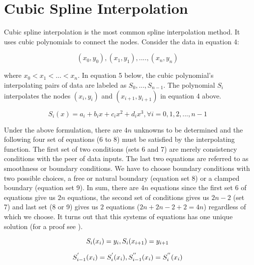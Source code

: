 \documentclass[12pt]{article}
\newcommand{\1}{\mathbbm 1}
\begin{document}
		
		\section*{Cubic Spline Interpolation}
		
		Cubic spline interpolation is the most common spline interpolation method. It uses cubic polynomials to connect the nodes. Consider the data in equation 4:
		
		\begin{equation}
			(x_{0}, y_{0}), (x_{1}, y_{1}), .... , (x_{n}, y_{n})
		\end{equation}
		
		
		where $x_{0} < x_{1} < ... < x_{n}$. In equation 5 below, the cubic polynomial's interpolating pairs of data are labeled as $S_{0},..., S_{n-1}$. The polynomial $S_{i}$ interpolates the nodes $(x_{i}, y_{i})$ and $(x_{i+1}, y_{i+1})$ in equation 4 above.
		
		
		\begin{equation}
			S_{i}(x) = a_{i} + b_{i}x + c_{i}x^{2} + d_{i}x^{3}, \forall i = 0, 1, 2, ... ,n-1
		\end{equation}
		
		
		Under the above formulation, there are $4n$ unknowns to be determined and the following four set of equations (6 to 8) must be satisfied by the interpolating function. The first set of two conditions (sets 6 and 7) are merely consistency conditions with the peer of data inputs. The last two equations are referred to as smoothness or boundary conditions. We have to choose boundary conditions with two possible choices, a free or natural boundary (equation set 8) or a clamped boundary (equation set 9). In sum, there are $4n$ equations since the first set 6 of equations give us $2n$ equations, the second set of conditions gives us $2n-2$ (set 7) and last set (8 or 9) gives us $2$ equations ($2n + 2n -2 + 2 = 4n$) regardless of which we choose. It turns out that this systems of equations has one unique solution (for a proof see \cite{burden2015numerical}).
		
		
		
		
		\begin{equation}
			S_{i}(x_{i}) = y_{i}, \\ S_{i}(x_{i+1}) = y_{i+1}
		\end{equation}
		
		\begin{equation}
			S_{i-1}^{'}(x_{i}) = S_{i}^{'}(x_{i}), \\ S_{i-1}^{''}(x_{i}) = S_{i}^{''}(x_{i})
		\end{equation}
		
\end{document}

